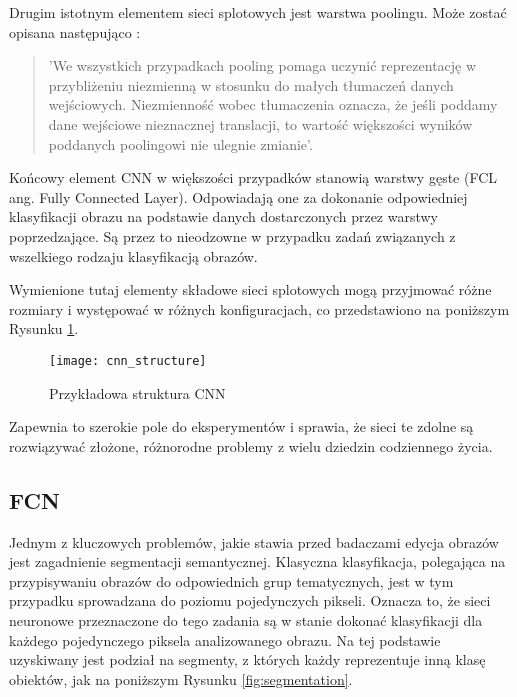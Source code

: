     Drugim istotnym elementem sieci splotowych jest warstwa poolingu. Może zostać opisana następująco \cite{deeplearn}:
    \begin{quote}
      'We wszystkich przypadkach pooling pomaga uczynić reprezentację w przybliżeniu niezmienną w stosunku do małych tłumaczeń danych wejściowych. Niezmienność wobec tłumaczenia oznacza, że jeśli poddamy dane wejściowe nieznacznej translacji, to wartość większości wyników poddanych poolingowi nie ulegnie zmianie'.
    \end{quote}

    Końcowy element CNN w większości przypadków stanowią warstwy gęste (FCL ang. Fully Connected Layer). Odpowiadają one za dokonanie odpowiedniej klasyfikacji obrazu na podstawie danych dostarczonych przez warstwy poprzedzające. Są przez to nieodzowne w przypadku zadań związanych z wszelkiego rodzaju klasyfikacją obrazów.

    Wymienione tutaj elementy składowe sieci splotowych mogą przyjmować różne rozmiary i występować w różnych konfiguracjach, co przedstawiono na poniższym Rysunku \ref{fig:cnn_structure}.
    \begin{figure}[h]
     \centering
     \texttt{[image: cnn\_structure]}
     \caption[Przykładowa struktura CNN - źródło: \url{https://www.mathworks.com/solutions/deep-learning/convolutional-neural-network.html}]{Przykładowa struktura CNN}
     \label{fig:cnn_structure}
    \end{figure}
    \newline
    Zapewnia to szerokie pole do eksperymentów i sprawia, że sieci te zdolne są rozwiązywać złożone, różnorodne problemy z wielu dziedzin codziennego życia.

  \subsection{FCN}

   Jednym z kluczowych problemów, jakie stawia przed badaczami edycja obrazów jest zagadnienie segmentacji semantycznej. Klasyczna klasyfikacja, polegająca na przypisywaniu obrazów do odpowiednich grup tematycznych, jest w tym przypadku sprowadzana do poziomu pojedynczych pikseli. Oznacza to, że sieci neuronowe przeznaczone do tego zadania są w stanie dokonać klasyfikacji dla każdego pojedynczego piksela analizowanego obrazu. Na tej podstawie uzyskiwany jest podział na segmenty, z których każdy reprezentuje inną klasę obiektów, jak na poniższym Rysunku \ref{fig:segmentation}.

